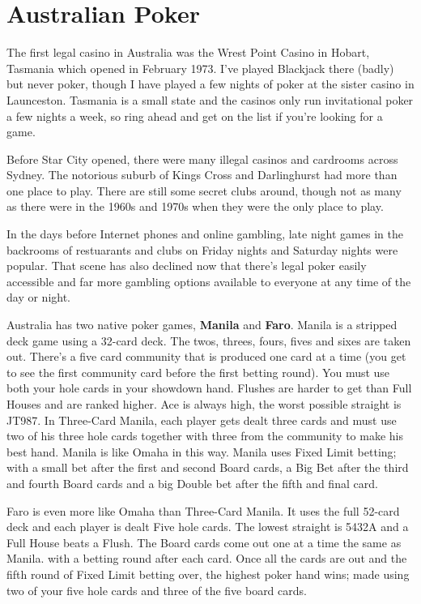 \section{Australian Poker}

The first legal casino in Australia was the Wrest Point Casino in
Hobart, Tasmania which opened in February 1973. I've played Blackjack
there (badly) but never poker, though I have played a few nights of
poker at the sister casino in Launceston. Tasmania is a small state
and the casinos only run invitational poker a few nights a week, so
ring ahead and get on the list if you're looking for a game.

Before Star City opened, there were many illegal casinos and
cardrooms across Sydney. The notorious suburb of Kings Cross and
Darlinghurst had more than one place to play. There are still some
secret clubs around, though not as many as there were in
the 1960s and 1970s when they were the only place to play.

In the days before Internet phones and online gambling, late night
games in the backrooms of restuarants and clubs on Friday nights and
Saturday nights were popular. That scene has also declined now that
there's legal poker easily accessible and far more gambling options
available to everyone at any time of the day or night.

Australia has two native poker games, \textbf{Manila} and
\textbf{Faro}. Manila is a stripped deck game using a 32-card
deck. The twos, threes, fours, fives and sixes are taken out.
There's a five card community that is produced one card at a time (you
get to see the first community card before the first betting round).
You must use both your hole cards in your showdown hand. Flushes are harder
to get than Full Houses and are ranked higher. Ace is always high, the
worst possible straight is JT987. In Three-Card Manila,
each player gets dealt three cards and must use two of his three hole
cards together with three from the community to make his best
hand. Manila is like Omaha in this way. Manila uses Fixed Limit
betting; with a small bet after the first and second Board cards, a
Big Bet after the third and fourth Board cards and a big Double bet
after the fifth and final card.

Faro is even more like Omaha than Three-Card Manila. It uses the full
52-card deck and each player is dealt Five hole cards. The lowest
straight is 5432A and a Full House beats a Flush. The Board
cards come out one at a time the same as Manila. with a betting round
after each card. Once all the cards are out and the fifth round of
Fixed Limit betting over, the highest poker hand wins; made using two
of your five hole cards and three of the five board cards.

